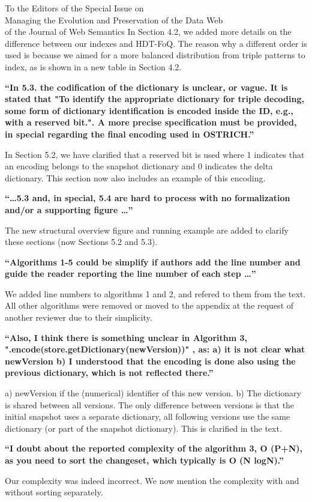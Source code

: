 \documentclass{letter}
\newcounter{section}
\begin{document}
\begin{letter}{To the Editors of the Special Issue on\\Managing the Evolution and Preservation of the Data Web\\of the Journal of Web Semantics}
In Section 4.2, we added more details on the difference between our indexes and HDT-FoQ.
The reason why a different order is used is because we aimed for a more balanced distribution from triple patterns to index,
as is shown in a new table in Section 4.2.

\textbf{\enquote{In 5.3. the codification of the dictionary is unclear, or vague. It is stated that "To identify the appropriate dictionary for triple decoding, some form of dictionary identification is encoded inside the ID, e.g., with a reserved bit.". A more precise specification must be provided, in special regarding the final encoding used in OSTRICH.}}

In Section 5.2, we have clarified that a reserved bit is used where 1 indicates that an encoding
belongs to the snapshot dictionary and 0 indicates the delta dictionary.
This section now also includes an example of this encoding.

\textbf{\enquote{\ldots 5.3 and, in special, 5.4 are hard to process with no formalization and/or a supporting figure \ldots}}

The new structural overview figure and running example are added to clarify these sections (now Sections 5.2 and 5.3).

\textbf{\enquote{Algorithms 1-5 could be simplify if authors add the line number and guide the reader reporting the line number of each step \ldots}}

We added line numbers to algorithms 1 and 2, and refered to them from the text.
All other algorithms were removed or moved to the appendix at the request of another reviewer due to their simplicity.

\textbf{\enquote{Also, I think there is something unclear in Algorithm 3, ".encode(store.getDictionary(newVersion))" , as: a) it is not clear what newVersion b) I understood that the encoding is done also using the previous dictionary, which is not reflected there.}}

a) newVersion if the (numerical) identifier of this new version.
b) The dictionary is shared between all versions. The only difference between versions is that the initial snapshot uses a separate dictionary, all following versions use the same dictionary (or part of the snapshot dictionary).
This is clarified in the text.

\textbf{\enquote{I doubt about the reported complexity of the algorithm 3, O (P+N), as you need to sort the changeset, which typically is O (N logN).}}

Our complexity was indeed incorrect. We now mention the complexity with and without sorting separately.


\end{letter}
\end{document}

